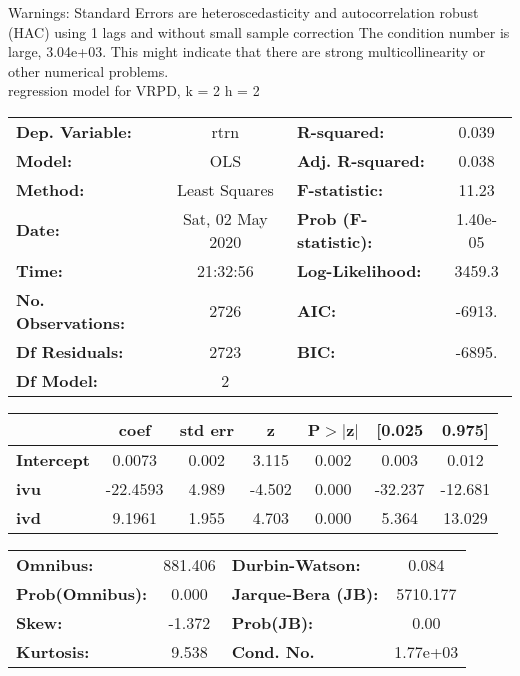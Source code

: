 Warnings: \newline
 [1] Standard Errors are heteroscedasticity and autocorrelation robust (HAC) using 1 lags and without small sample correction \newline
 [2] The condition number is large, 3.04e+03. This might indicate that there are \newline
 strong multicollinearity or other numerical problems.\\ 

regression model for VRPD, k = 2 h = 2\begin{center}
\begin{tabular}{lclc}
\toprule
\textbf{Dep. Variable:}    &       rtrn       & \textbf{  R-squared:         } &     0.039   \\
\textbf{Model:}            &       OLS        & \textbf{  Adj. R-squared:    } &     0.038   \\
\textbf{Method:}           &  Least Squares   & \textbf{  F-statistic:       } &     11.23   \\
\textbf{Date:}             & Sat, 02 May 2020 & \textbf{  Prob (F-statistic):} &  1.40e-05   \\
\textbf{Time:}             &     21:32:56     & \textbf{  Log-Likelihood:    } &    3459.3   \\
\textbf{No. Observations:} &        2726      & \textbf{  AIC:               } &    -6913.   \\
\textbf{Df Residuals:}     &        2723      & \textbf{  BIC:               } &    -6895.   \\
\textbf{Df Model:}         &           2      & \textbf{                     } &             \\
\bottomrule
\end{tabular}
\begin{tabular}{lcccccc}
                   & \textbf{coef} & \textbf{std err} & \textbf{z} & \textbf{P$> |$z$|$} & \textbf{[0.025} & \textbf{0.975]}  \\
\midrule
\textbf{Intercept} &       0.0073  &        0.002     &     3.115  &         0.002        &        0.003    &        0.012     \\
\textbf{ivu}       &     -22.4593  &        4.989     &    -4.502  &         0.000        &      -32.237    &      -12.681     \\
\textbf{ivd}       &       9.1961  &        1.955     &     4.703  &         0.000        &        5.364    &       13.029     \\
\bottomrule
\end{tabular}
\begin{tabular}{lclc}
\textbf{Omnibus:}       & 881.406 & \textbf{  Durbin-Watson:     } &    0.084  \\
\textbf{Prob(Omnibus):} &   0.000 & \textbf{  Jarque-Bera (JB):  } & 5710.177  \\
\textbf{Skew:}          &  -1.372 & \textbf{  Prob(JB):          } &     0.00  \\
\textbf{Kurtosis:}      &   9.538 & \textbf{  Cond. No.          } & 1.77e+03  \\
\bottomrule
\end{tabular}
\end{center}

